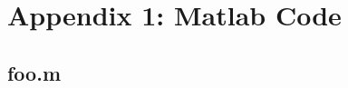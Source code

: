 \documentclass{article}
\begin{document}


\clearpage
\pagebreak
\printbibliography

\section*{Appendix 1: Matlab Code}
\subsection*{foo.m}
\begin{lstlisting}[language=Matlab]
\end{lstlisting}
\end{document}

